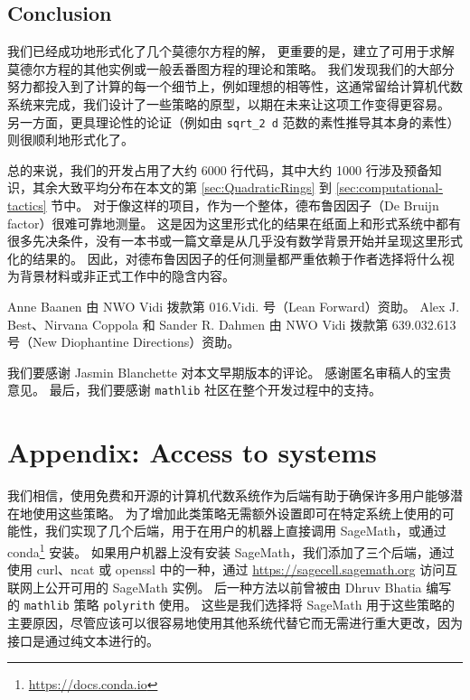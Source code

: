 \documentclass[sigplan,10pt,nonacm,
screen]{acmart} \settopmatter{printfolios=true,printccs=false,printacmref=false}
\newcommand{\tb}[1]{\todo[color=cyan]{TB: #1}}
\newcommand{\mathlib}{\lstinline{mathlib}\xspace}
\begin{document}
\subsection{Conclusion}\label{sec:Conclusion}

我们已经成功地形式化了几个莫德尔方程的解，
更重要的是，建立了可用于求解莫德尔方程的其他实例或一般丢番图方程的理论和策略。
我们发现我们的大部分努力都投入到了计算的每一个细节上，例如理想的相等性，这通常留给计算机代数系统来完成，我们设计了一些策略的原型，以期在未来让这项工作变得更容易。
另一方面，更具理论性的论证（例如由 \lstinline{sqrt_2 d} 范数的素性推导其本身的素性）则很顺利地形式化了。

总的来说，我们的开发占用了大约 6000 行代码，其中大约 1000 行涉及预备知识，其余大致平均分布在本文的第 \ref{sec:QuadraticRings} 到 \ref{sec:computational-tactics} 节中。 %
对于像这样的项目，作为一个整体，德布鲁因因子（De Bruijn factor）很难可靠地测量。
这是因为这里形式化的结果在纸面上和形式系统中都有很多先决条件，没有一本书或一篇文章是从几乎没有数学背景开始并呈现这里形式化的结果的。
因此，对德布鲁因因子的任何测量都严重依赖于作者选择将什么视为背景材料或非正式工作中的隐含内容。

\begin{acks}
Anne Baanen 由 NWO Vidi 拨款第 016.Vidi. 号（Lean Forward）资助。
Alex J. Best、Nirvana Coppola 和 Sander R. Dahmen 由 NWO Vidi 拨款第 639.032.613 号（New Diophantine Directions）资助。

我们要感谢 Jasmin Blanchette 对本文早期版本的评论。
感谢匿名审稿人的宝贵意见。
最后，我们要感谢 \mathlib 社区在整个开发过程中的支持。
\end{acks}

\appendix

\section{Appendix: Access to systems}\label{app:access}

我们相信，使用免费和开源的计算机代数系统作为后端有助于确保许多用户能够潜在地使用这些策略。
为了增加此类策略无需额外设置即可在特定系统上使用的可能性，我们实现了几个后端，用于在用户的机器上直接调用 SageMath，或通过 conda\footnote{\url{https://docs.conda.io}} 安装。
如果用户机器上没有安装 SageMath，我们添加了三个后端，通过使用 curl、ncat 或 openssl 中的一种，通过 \url{https://sagecell.sagemath.org} 访问互联网上公开可用的 SageMath 实例。
后一种方法以前曾被由 Dhruv Bhatia 编写的 \mathlib 策略 \lstinline{polyrith} 使用。
这些是我们选择将 SageMath 用于这些策略的主要原因，尽管应该可以很容易地使用其他系统代替它而无需进行重大更改，因为接口是通过纯文本进行的。
\end{document}
